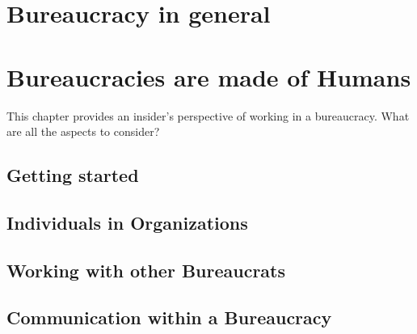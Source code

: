 \documentclass{book}
\begin{document}
\chapter{Bureaucracy in general}
   \newpage
   \newpage
  \newpage
  \newpage
  \newpage
  \newpage
  \newpage
  \newpage


\chapter{Bureaucracies are made of Humans\label{b_made_of_humans}}

This chapter provides an insider's perspective of working in a bureaucracy. What are all the aspects to consider?

  \section{Getting started}
    
    
    
    
  \newpage
  \section{Individuals in Organizations}
    
    
    
    
  \newpage
  \section{Working with other Bureaucrats}
    
    
    
    
  \newpage
  
    
    
    
  \newpage
  \section{Communication within a Bureaucracy}
    
    
    
  \newpage
\end{document}
